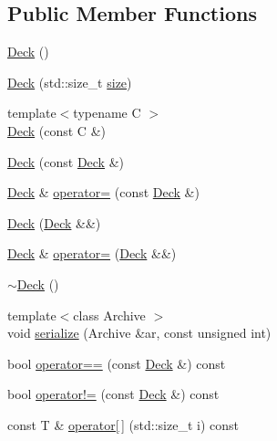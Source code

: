 \subsection*{Public Member Functions}
\begin{DoxyCompactItemize}
\item 
\hyperlink{classpan_1_1detail_1_1_deck_a022f77a6a1618e8ab2aa938859873e96}{Deck} ()
\item 
\hyperlink{classpan_1_1detail_1_1_deck_a6038518a1177afd95ed05d93ed90aa52}{Deck} (std\+::size\+\_\+t \hyperlink{classpan_1_1detail_1_1_deck_a4ccde71b3fae9ce2ea3da99ad500c9ba}{size})
\item 
{\footnotesize template$<$typename C $>$ }\\\hyperlink{classpan_1_1detail_1_1_deck_a40c6e297b96eea183986fae9e1441a74}{Deck} (const C \&)
\item 
\hyperlink{classpan_1_1detail_1_1_deck_a297086e3603a1960541f748c63af8ced}{Deck} (const \hyperlink{classpan_1_1detail_1_1_deck}{Deck} \&)
\item 
\hyperlink{classpan_1_1detail_1_1_deck}{Deck} \& \hyperlink{classpan_1_1detail_1_1_deck_a8a33b4bc1c46e71b918c39e088d5dee9}{operator=} (const \hyperlink{classpan_1_1detail_1_1_deck}{Deck} \&)
\item 
\hyperlink{classpan_1_1detail_1_1_deck_a051b16fa5c1c5a40703dc1e8e1d9700e}{Deck} (\hyperlink{classpan_1_1detail_1_1_deck}{Deck} \&\&)
\item 
\hyperlink{classpan_1_1detail_1_1_deck}{Deck} \& \hyperlink{classpan_1_1detail_1_1_deck_a1c8b3bed015f5dce938b22b6cc7c53d9}{operator=} (\hyperlink{classpan_1_1detail_1_1_deck}{Deck} \&\&)
\item 
\hyperlink{classpan_1_1detail_1_1_deck_a1ba732dffcccfdf0be1eb2481dc56421}{$\sim$\+Deck} ()
\item 
{\footnotesize template$<$class Archive $>$ }\\void \hyperlink{classpan_1_1detail_1_1_deck_a92252be8ce9a2f0ec7604c6471c1bf81}{serialize} (Archive \&ar, const unsigned int)
\item 
bool \hyperlink{classpan_1_1detail_1_1_deck_a0037b1f2bd8d60577b2943f9fefa5417}{operator==} (const \hyperlink{classpan_1_1detail_1_1_deck}{Deck} \&) const
\item 
bool \hyperlink{classpan_1_1detail_1_1_deck_ad63bb7177e7e051fec7beae3a3989cf7}{operator!=} (const \hyperlink{classpan_1_1detail_1_1_deck}{Deck} \&) const
\item 
const T \& \hyperlink{classpan_1_1detail_1_1_deck_a49faca6aade745781eeaa048902c3045}{operator\mbox{[}$\,$\mbox{]}} (std\+::size\+\_\+t i) const

\end{DoxyCompactItemize}
